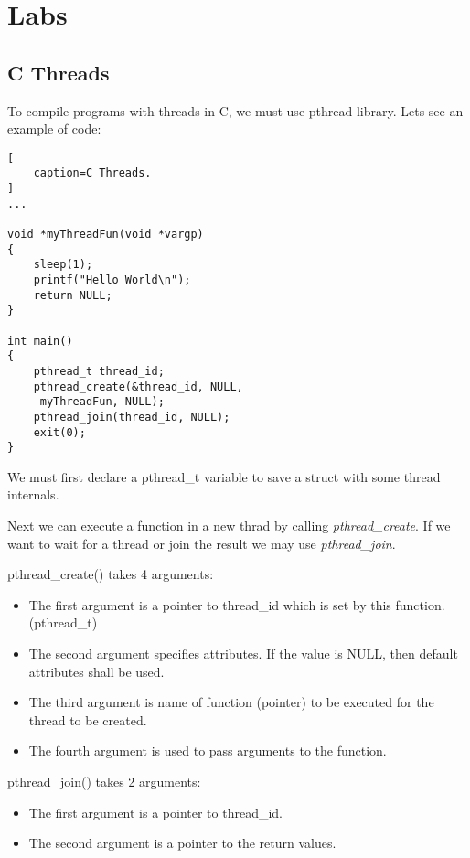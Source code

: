 \section{Labs}

\subsection{C Threads}

To compile programs with threads in C, we must use pthread library. Lets see an example of code:

\begin{lstlisting}[
    caption=C Threads.
]
...

void *myThreadFun(void *vargp) 
{ 
    sleep(1); 
    printf("Hello World\n"); 
    return NULL; 
} 
   
int main() 
{ 
    pthread_t thread_id; 
    pthread_create(&thread_id, NULL,
     myThreadFun, NULL); 
    pthread_join(thread_id, NULL); 
    exit(0); 
}

\end{lstlisting}

We must first declare a pthread\_t variable to save a struct with some thread internals.

Next we can execute a function in a new thrad by calling \textit{pthread\_create}. If we want to wait for a thread or join the result we may use \textit{pthread\_join}.

pthread\_create() takes 4 arguments:
\begin{itemize}
    \item The first argument is a pointer to thread\_id which is set by this function. (pthread\_t)
    \item The second argument specifies attributes. If the value is NULL, then default attributes shall be used.
    \item The third argument is name of function (pointer) to be executed for the thread to be created.
    \item The fourth argument is used to pass arguments to the function.
\end{itemize}

pthread\_join() takes 2 arguments:

\begin{itemize}
    \item The first argument is a pointer to thread\_id.
    \item The second argument is a pointer to the return values.
\end{itemize}

